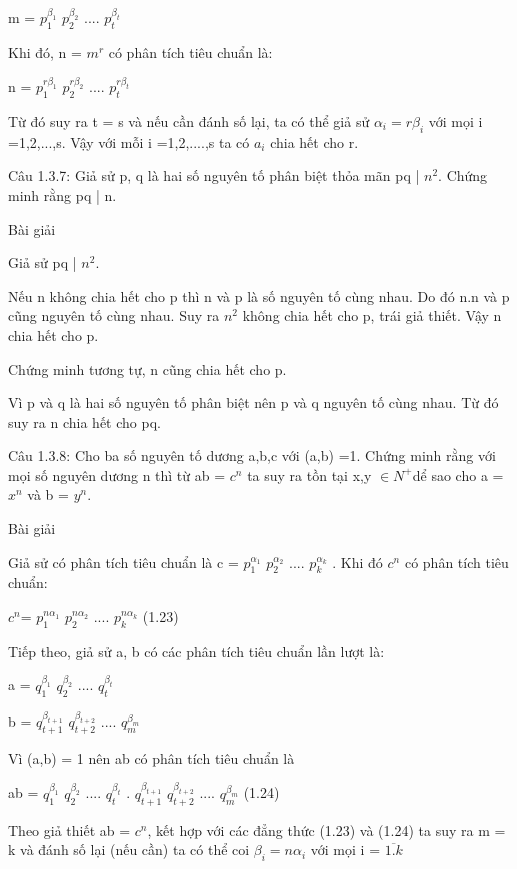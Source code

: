 \documentclass{article}
\begin{document}
      
       \centerline{ m = $p^{\beta_{1}}_{1}$ $p^{\beta_{2}}_{2}$ ....  $p^{\beta_{t}}_{t}$}
       
      Khi đó, n = $m^{r}$ có phân tích tiêu chuẩn là:
      
      
      \centerline{ n = $p^{r\beta_{1}}_{1}$ $p^{r\beta_{2}}_{2}$ ....  $p^{r\beta_{t}}_{t}$}
      
    Từ đó suy ra t = s và nếu cần đánh số lại, ta có thể giả sử $\alpha_{i} = r\beta_{i}$ với mọi i =1,2,...,s. Vậy với mỗi i =1,2,....,s ta có $a_{i}$ chia hết cho r.
    
    Câu 1.3.7: Giả sử p, q là hai số nguyên tố phân biệt thỏa mãn  pq |  $n^{2}$. Chứng minh rằng pq | n.
    
    \centerline{Bài giải}
    
    Giả sử pq | $n^{2}$.
    
    Nếu n không chia hết cho p thì n và p là số nguyên tố cùng nhau. Do đó n.n và p cũng nguyên tố cùng nhau. Suy ra $n^{2}$ không chia hết cho p, trái giả thiết. Vậy n chia hết cho p.
    
    Chứng minh tương tự, n cũng chia hết cho p.
    
    Vì p và q là hai số nguyên tố phân biệt nên p và q nguyên tố cùng nhau. Từ đó suy ra n chia hết cho pq.
    
    Câu 1.3.8:  Cho ba số nguyên tố dương a,b,c với (a,b) =1. Chứng minh rằng với mọi số nguyên dương n thì từ ab = $c^{n}$ ta suy ra tồn tại x,y $\in N^{+}$dể sao cho a = $x^{n}$ và b = $y^{n}$.

\centerline{Bài giải}
    
Giả sử có phân tích tiêu chuẩn là c = $p^{\alpha_{1}}_{1}$ $p^{\alpha_{2}}_{2}$ ....  $p^{\alpha_{k}}_{k}$ . Khi đó $c^{n}$ có phân tích tiêu chuẩn:

\centerline{$c^{n} $= $p^{n\alpha_{1}}_{1}$ $p^{n\alpha_{2}}_{2}$ ....  $p^{n\alpha_{k}}_{k}$ \hspace{2.5cm} (1.23)}

Tiếp theo, giả sử a, b có các phân tích tiêu chuẩn lần lượt là:

\centerline{a = $q^{\beta_{1}}_{1}$ $q^{\beta_{2}}_{2}$ ....  $q^{\beta_{t}}_{t}$}

\centerline{b = $q^{\beta_{t+1}}_{t+1}$ $q^{\beta_{t+2}}_{t+2}$ ....  $q^{\beta_{m}}_{m}$}

Vì (a,b) = 1 nên ab có phân tích tiêu chuẩn là 

\centerline{ab = $q^{\beta_{1}}_{1}$ $q^{\beta_{2}}_{2}$ ....  $q^{\beta_{t}}_{t}$ . $q^{\beta_{t+1}}_{t+1}$ $q^{\beta_{t+2}}_{t+2}$ ....  $q^{\beta_{m}}_{m}$ (1.24)}

Theo giả thiết ab = $c^{n}$, kết hợp với các đẳng thức (1.23) và (1.24) ta suy ra m = k và đánh số lại (nếu cần) ta có thể coi $\beta_{i} = n\alpha_{i}$ với mọi i = $\overline{1.k}$ 
       
      
\end{document}
